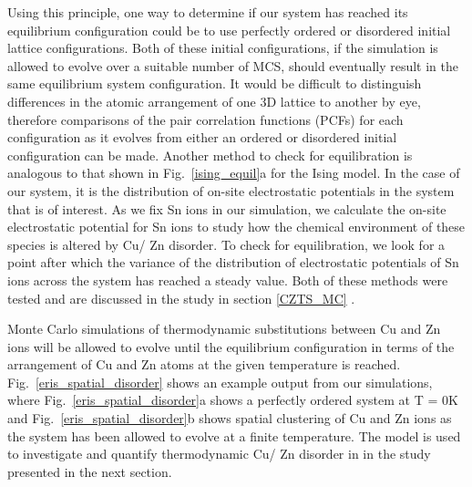 \documentclass[11pt, twoside]{report}
\begin{document}
Using this principle, one way to determine if our system has reached its equilibrium configuration could be to use perfectly ordered or disordered initial lattice configurations. Both of these initial configurations, if the simulation is allowed to evolve over a suitable number of MCS, should eventually result in the same equilibrium system configuration. It would be difficult to distinguish differences in the atomic arrangement of one 3D lattice to another by eye, therefore comparisons of the pair correlation functions (PCFs) for each configuration as it evolves from either an ordered or disordered initial configuration can be made. 
Another method to check for equilibration is analogous to that shown in Fig.~\ref{ising_equil}a for the Ising model. In the case of our system, it is the distribution of on-site electrostatic potentials in the system that is of interest. As we fix Sn ions in our simulation, we calculate the on-site electrostatic potential for Sn ions to study how the chemical environment of these species is altered by Cu/ Zn disorder. To check for equilibration, we look for a point after which the variance of the distribution of electrostatic potentials of Sn ions across the system has reached a steady value. Both of these methods were tested and are discussed in the study in section \ref{CZTS_MC} \cite{eris_paper}.

Monte Carlo simulations of thermodynamic substitutions between Cu and Zn ions will be allowed to evolve until the equilibrium configuration in terms of the arrangement of Cu and Zn atoms at the given temperature is reached. Fig.~\ref{eris_spatial_disorder} shows an example output from our simulations, where Fig.~\ref{eris_spatial_disorder}a shows a perfectly ordered system at T = 0K and Fig.~\ref{eris_spatial_disorder}b shows spatial clustering of Cu and Zn ions as the system has been allowed to evolve at a finite temperature. The model is used to investigate and quantify thermodynamic Cu/ Zn disorder in {\CZTS} in the study presented in the next section. 
\end{document}
